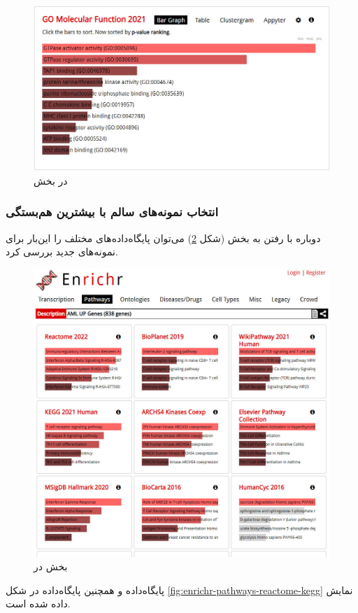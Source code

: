 \documentclass{article}
\begin{document}
\begin{figure}[h!]
	\centering
	\includegraphics[width=0.5\columnwidth]{figs/enrichr-ontologies-mf.jpg}
	\caption{ در بخش }
	\label{fig:enrichr-ontology-mf}
\end{figure}

\subsubsection{انتخاب نمونه‌های سالم با بیشترین هم‌بستگی}
دوباره با رفتن به بخش  (شکل \ref{fig:enrichr-pathways-2}) می‌توان پایگاه‌داده‌های  مختلف را این‌بار برای نمونه‌های جدید بررسی کرد.
\begin{figure}[h!]
	\centering
	\includegraphics[width=0.5\columnwidth]{figs/enrichr-pathways-2.jpg}
	\caption{بخش  در }
	\label{fig:enrichr-pathways-2}
\end{figure}

پایگاه‌داده  و همچنین پایگاه‌داده  در شکل \ref{fig:enrichr-pathways-reactome-kegg} نمایش داده شده است.
\end{document}
